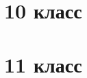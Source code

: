 \section{10 класс}

\AddProb 

\AddProb 

\AddProb 

\AddProb 



\section{11 класс}

\AddProb 

\AddProb 

\AddProb 

\AddProb 